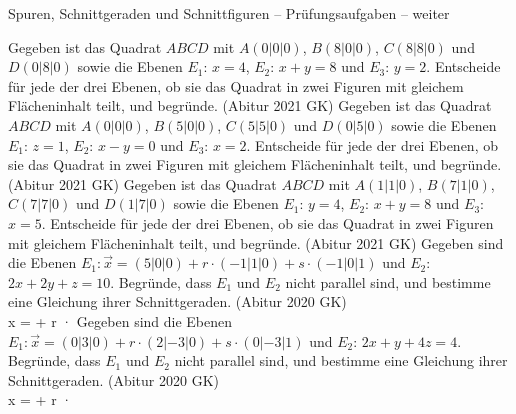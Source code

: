 \begin{aufgabe}{Spuren, Schnittgeraden und Schnittfiguren – Prüfungsaufgaben – weiter}
\begin{teile}
\teil Gegeben ist das Quadrat $ABCD$ mit $A(0|0|0)$, $B(8|0|0)$, $C(8|8|0)$ und $D(0|8|0)$ sowie die Ebenen $E_1$: $x = 4$, $E_2$: $x + y = 8$ und $E_3$: $y = 2$. Entscheide für jede der drei Ebenen, ob sie das Quadrat in zwei Figuren mit gleichem Flächeninhalt teilt, und begründe. \hfill (Abitur 2021 GK)
\teil Gegeben ist das Quadrat $ABCD$ mit $A(0|0|0)$, $B(5|0|0)$, $C(5|5|0)$ und $D(0|5|0)$ sowie die Ebenen $E_1$: $z = 1$, $E_2$: $x - y = 0$ und $E_3$: $x = 2$. Entscheide für jede der drei Ebenen, ob sie das Quadrat in zwei Figuren mit gleichem Flächeninhalt teilt, und begründe. \hfill (Abitur 2021 GK)
\teil Gegeben ist das Quadrat $ABCD$ mit $A(1|1|0)$, $B(7|1|0)$, $C(7|7|0)$ und $D(1|7|0)$ sowie die Ebenen $E_1$: $y = 4$, $E_2$: $x + y = 8$ und $E_3$: $x = 5$. Entscheide für jede der drei Ebenen, ob sie das Quadrat in zwei Figuren mit gleichem Flächeninhalt teilt, und begründe. \hfill (Abitur 2021 GK)
\teil Gegeben sind die Ebenen $E_1: \vec{x} = (5|0|0) + r \cdot (-1|1|0) + s \cdot (-1|0|1)$ und $E_2$: $2x + 2y + z = 10$. Begründe, dass $E_1$ und $E_2$ nicht parallel sind, und bestimme eine Gleichung ihrer Schnittgeraden. \hfill (Abitur 2020 GK) \\ x = \leerfeld + r · \leerfeld
\teil Gegeben sind die Ebenen $E_1: \vec{x} = (0|3|0) + r \cdot (2|-3|0) + s \cdot (0|-3|1)$ und $E_2$: $2x + y + 4z = 4$. Begründe, dass $E_1$ und $E_2$ nicht parallel sind, und bestimme eine Gleichung ihrer Schnittgeraden. \hfill (Abitur 2020 GK) \\ x = \leerfeld + r · \leerfeld
\end{teile}
\end{aufgabe}
